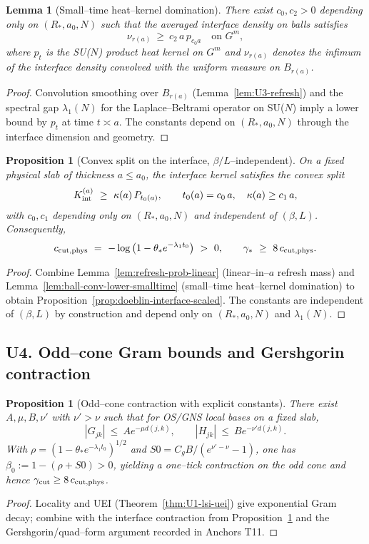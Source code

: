 \documentclass[11pt]{amsart}
\theoremstyle{plain}
\newtheorem{lemma}[theorem]{Lemma}
\newtheorem{proposition}[theorem]{Proposition}
\theoremstyle{definition}
\theoremstyle{remark}
\begin{document}
\begin{lemma}[Small–time heat–kernel domination]\label{lem:U3-hk}
There exist $c_0,c_2>0$ depending only on $(R_*,a_0,N)$ such that the averaged interface density on balls satisfies
\[
  \nu_{r(a)}\ \ge\ c_2\,a\,p_{c_0 a}\quad\text{on }G^m,
\]
where $p_t$ is the SU($N$) product heat kernel on $G^m$ and $\nu_{r(a)}$ denotes the infimum of the interface density convolved with the uniform measure on $B_{r(a)}$.
\end{lemma}
\begin{proof}
Convolution smoothing over $B_{r(a)}$ (Lemma~\ref{lem:U3-refresh}) and the spectral gap $\lambda_1(N)$ for the Laplace–Beltrami operator on SU($N$) imply a lower bound by $p_{t}$ at time $t\asymp a$. The constants depend on $(R_*,a_0,N)$ through the interface dimension and geometry.
\end{proof}
\begin{proposition}[Convex split on the interface, $\beta/L$–independent]\label{prop:U3-interface}
On a fixed physical slab of thickness $a\le a_0$, the interface kernel satisfies the convex split
\[
  K_{\rm int}^{(a)}\ \ge\ \kappa(a)\,P_{t_0(a)},\qquad t_0(a)=c_0\,a,\quad \kappa(a)\ge c_1\,a,
\]
with $c_0,c_1$ depending only on $(R_*,a_0,N)$ and independent of $(\beta,L)$. Consequently,
\[
  c_{\rm cut,phys}\ =\ -\log\big(1-\theta_* e^{-\lambda_1 t_0}\big)\ >\ 0,\qquad \gamma_*\ \ge\ 8\,c_{\rm cut,phys}.
\]
\end{proposition}
\begin{proof}
Combine Lemma~\ref{lem:refresh-prob-linear} (linear–in–$a$ refresh mass) and Lemma~\ref{lem:ball-conv-lower-smalltime} (small–time heat–kernel domination) to obtain Proposition~\ref{prop:doeblin-interface-scaled}. The constants are independent of $(\beta,L)$ by construction and depend only on $(R_*,a_0,N)$ and $\lambda_1(N)$.
\end{proof}

\subsection{U4. Odd–cone Gram bounds and Gershgorin contraction}
\begin{proposition}[Odd–cone contraction with explicit constants]\label{prop:U4-oddcone}
There exist $A,\mu,B,\nu'$ with $\nu'>\nu$ such that for OS/GNS local bases on a fixed slab,
\[
  |G_{jk}|\ \le\ A e^{-\mu d(j,k)},\qquad |H_{jk}|\ \le\ B e^{-\nu' d(j,k)}.
\]
With $\rho=(1-\theta_* e^{-\lambda_1 t_0})^{1/2}$ and $S0= C_g B/(e^{\nu'-\nu}-1)$, one has $\beta_0:=1-(\rho+S0)>0$, yielding a one–tick contraction on the odd cone and hence $\gamma_{\rm cut}\ge 8\,c_{\rm cut,phys}$.
\end{proposition}
\begin{proof}
Locality and UEI (Theorem~\ref{thm:U1-lsi-uei}) give exponential Gram decay; combine with the interface contraction from Proposition~\ref{prop:U3-interface} and the Gershgorin/quad–form argument recorded in Anchors T11.
\end{proof}
\end{document}
